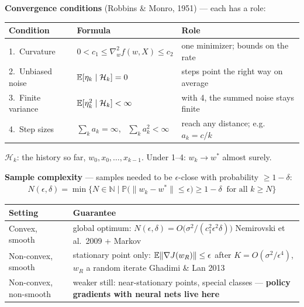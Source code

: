 \textbf{Convergence conditions} (Robbins \& Monro, 1951) --- each has a role:

\begin{center}
\small
\begin{tabularx}{\linewidth}{@{}l l L@{}}
\toprule
\textbf{Condition} & \textbf{Formula} & \textbf{Role} \\
.~Curvature & $0<c_1\le\nabla_w^2 f(w,X)\le c_2$ & one minimizer; bounds on the rate \\
2.~Unbiased noise & $\mathbb{E}[\eta_k\mid\mathcal H_k]=0$ & steps point the right way on average \\
3.~Finite variance & $\mathbb{E}[\eta_k^2\mid\mathcal H_k]<\infty$ & with 4, the summed noise stays finite \\
4.~Step sizes & $\sum_k a_k=\infty$, \ $\sum_k a_k^2<\infty$ & reach any distance; e.g.\ $a_k=c/k$ \\
\bottomrule
\end{tabularx}
\end{center}
{\footnotesize\color{NoteGray}$\mathcal H_k$: the history so far, $w_0,x_0,\dots,x_{k-1}$. Under 1--4: $w_k\to w^*$ almost surely.}

\textbf{Sample complexity} --- samples needed to be $\epsilon$-close with probability $\ge1-\delta$:
\begin{gather*}
  N(\epsilon,\delta) = \min\Big\{ N \in \mathbb{N} \;\Big|\; \mathbb{P}\big(\|w_k - w^*\| \le \epsilon\big) \ge 1-\delta \ \text{ for all } k \ge N \Big\}
\end{gather*}

\begin{center}
\small
\begin{tabularx}{\linewidth}{@{}l L@{}}
\toprule
\textbf{Setting} & \textbf{Guarantee} \\
\midrule
Convex, smooth & global optimum: $N(\epsilon,\delta)=O\big(\sigma^2/(c_1^2\epsilon^2\delta)\big)$ \hfill {\scriptsize\color{NoteGray}Nemirovski et al.\ 2009 + Markov} \\
Non-convex, smooth & stationary point only: $\mathbb{E}\|\nabla J(w_R)\|\le\epsilon$ after $K=O(\sigma^2/\epsilon^4)$, $w_R$ a random iterate \hfill {\scriptsize\color{NoteGray}Ghadimi \& Lan 2013} \\
{\color{AtlasCool}Non-convex, non-smooth} & {\color{AtlasCool}weaker still: near-stationary points, special classes --- \textbf{policy gradients with neural nets live here}} \\
\bottomrule
\end{tabularx}
\end{center}

